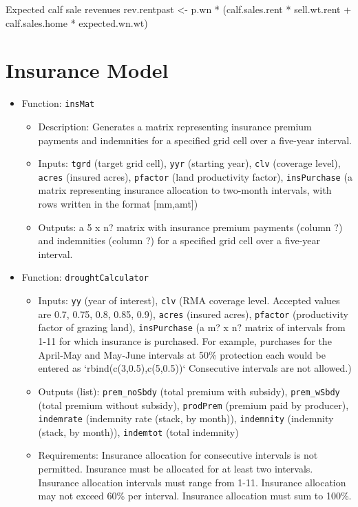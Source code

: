 \documentclass[11pt]{article}
\begin{document}
 Expected calf sale revenues
  rev.rentpast <- p.wn * (calf.sales.rent * sell.wt.rent + calf.sales.home * expected.wn.wt)
  


\section{Insurance Model}
\begin{itemize}
\item Function: \verb!insMat!
	\begin{itemize}
	\item Description: Generates a matrix representing insurance premium payments and indemnities for a specified grid cell over a five-year interval. 
	\item Inputs: \verb!tgrd! (target grid cell), \verb!yyr! (starting year), \verb!clv! (coverage level), \verb!acres! (insured acres), \verb!pfactor! (land productivity factor), \verb!insPurchase! (a matrix representing insurance allocation to two-month intervals, with rows written in the format [mm,amt])
	\item Outputs: a 5 x n? matrix with insurance premium payments (column ?) and indemnities (column ?) for a specified grid cell over a five-year interval. 
	\end{itemize}
\end{itemize}
	
\begin{itemize}
\item Function: \verb!droughtCalculator!
	\begin{itemize}
	\item Inputs: \verb!yy! (year of interest), \verb!clv! (RMA coverage level. Accepted values 
  are 0.7, 0.75, 0.8, 0.85, 0.9), \verb!acres! (insured acres), \verb!pfactor! (productivity factor of grazing land), \verb!insPurchase! (a m? x n? matrix of intervals from 1-11 for which insurance is purchased. For example, purchases for the April-May and May-June intervals at 50\% protection each would be entered as `rbind(c(3,0.5),c(5,0.5))` Consecutive intervals are not allowed.)
	\item Outputs (list): \verb!prem_noSbdy! (total premium with subsidy), \verb!prem_wSbdy! (total premium without subsidy), \verb!prodPrem! (premium paid by producer), \verb!indemrate! (indemnity rate (stack, by month)), \verb!indemnity! (indemnity (stack, by month)), \verb!indemtot! (total indemnity)  
	\item Requirements: Insurance allocation for consecutive intervals is not permitted. Insurance must be allocated for at least two intervals. Insurance allocation intervals must range from 1-11. Insurance allocation may not exceed 60\% per interval. Insurance allocation must sum to 100\%.
	\end{itemize}
\end{itemize}
\end{document}
